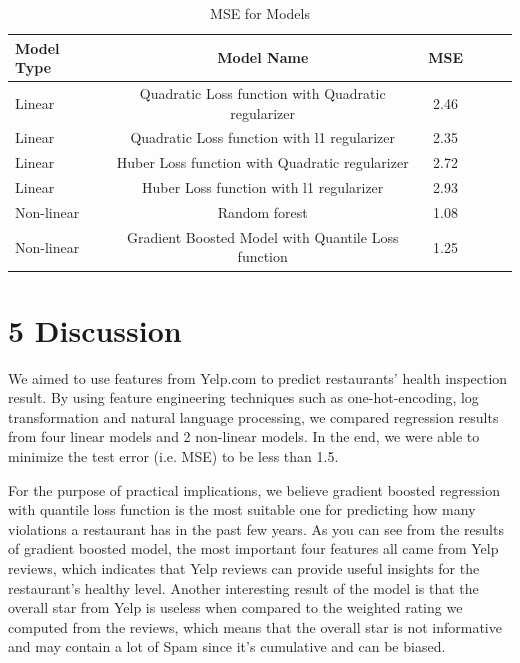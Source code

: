 \documentclass[letterpaper, 11 pt, conference]{ieeeconf}
\begin{document}
\begin {table}[h]
\caption {MSE for Models}
\begin{center}
	\tiny
	\begin{tabular}{l*{4}{c}r}
    \hline
	Model Type& Model Name & MSE\\
    \hline
    Linear& Quadratic Loss function with Quadratic regularizer& 2.46\\
    Linear& Quadratic Loss function with l1 regularizer& 2.35\\
    Linear& Huber Loss function with Quadratic regularizer& 2.72\\
    Linear& Huber Loss function with l1 regularizer& 2.93\\
    Non-linear & Random forest & 1.08 \\
    Non-linear & Gradient Boosted Model with Quantile Loss function & 1.25 \\
    \hline
	\end{tabular}
\end{center}
\end{table}



\section*{5 Discussion}
We aimed to use features from Yelp.com to predict restaurants' health inspection result. By using feature engineering techniques such as one-hot-encoding, log transformation and natural language processing, we compared regression results from four linear models and 2 non-linear models. In the end, we were able to minimize the test error (i.e. MSE) to be less than 1.5.

For the purpose of practical implications, we believe gradient boosted regression with quantile loss function is the most suitable one for predicting how many violations a restaurant has in the past few years. As you can see from the results of gradient boosted model, the most important four features all came from Yelp reviews, which indicates that Yelp reviews can provide useful insights for the restaurant's healthy level. Another interesting result of the model is that the overall star from Yelp is useless when compared to the weighted rating we computed from the reviews, which means that the overall star is not informative and may contain a lot of Spam since it's cumulative and can be biased.  
\end{document}
